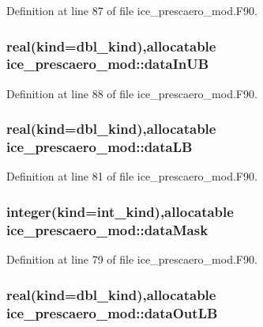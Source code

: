 Definition at line 87 of file ice\_\-prescaero\_\-mod.F90.\hypertarget{namespaceice__prescaero__mod_a0f7120047c00901e14be1cb218202430}{
\subsubsection[{dataInUB}]{\setlength{\rightskip}{0pt plus 5cm}real(kind=dbl\_\-kind),allocatable {\bf ice\_\-prescaero\_\-mod::dataInUB}}}
\label{namespaceice__prescaero__mod_a0f7120047c00901e14be1cb218202430}


Definition at line 88 of file ice\_\-prescaero\_\-mod.F90.\hypertarget{namespaceice__prescaero__mod_adb7c17b56a47e03225f2fe34bee46d47}{
\subsubsection[{dataLB}]{\setlength{\rightskip}{0pt plus 5cm}real(kind=dbl\_\-kind),allocatable {\bf ice\_\-prescaero\_\-mod::dataLB}}}
\label{namespaceice__prescaero__mod_adb7c17b56a47e03225f2fe34bee46d47}


Definition at line 81 of file ice\_\-prescaero\_\-mod.F90.\hypertarget{namespaceice__prescaero__mod_ab34b112295019ba547110ff459523bd4}{
\subsubsection[{dataMask}]{\setlength{\rightskip}{0pt plus 5cm}integer(kind=int\_\-kind),allocatable {\bf ice\_\-prescaero\_\-mod::dataMask}}}
\label{namespaceice__prescaero__mod_ab34b112295019ba547110ff459523bd4}


Definition at line 79 of file ice\_\-prescaero\_\-mod.F90.\hypertarget{namespaceice__prescaero__mod_ab068cb9460ac0d6936bf8b6ffc60d694}{
\subsubsection[{dataOutLB}]{\setlength{\rightskip}{0pt plus 5cm}real(kind=dbl\_\-kind),allocatable {\bf ice\_\-prescaero\_\-mod::dataOutLB}}}
\label{namespaceice__prescaero__mod_ab068cb9460ac0d6936bf8b6ffc60d694}



